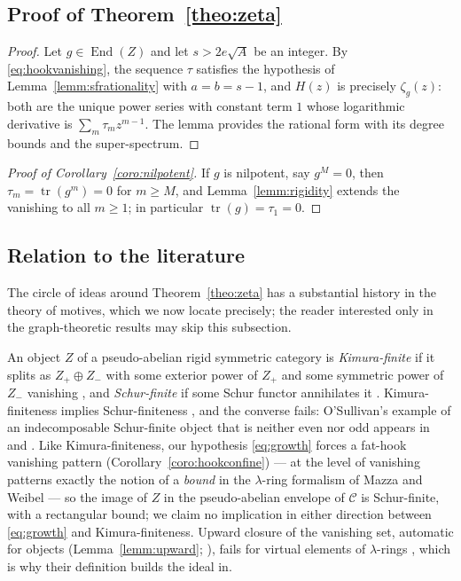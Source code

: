 \documentclass[11pt]{article}
\newcommand{\End}{\operatorname{End}}
\newcommand{\tr}{\operatorname{tr}}
\newcommand{\tzeta}[1]{\zeta_{#1}}                %
\begin{document}
\subsection{Proof of Theorem~\ref{theo:zeta}}\label{subsec:appproof}

\begin{proof}
Let $g\in\End(Z)$ and let $s>2e\sqrt{A}$ be an integer. By
\eqref{eq:hookvanishing}, the sequence $\tau$ satisfies the
hypothesis of Lemma~\ref{lemm:sfrationality} with $a=b=s-1$, and
$H(z)$ is precisely $\tzeta{g}(z)$: both are the unique power
series with constant term $1$ whose logarithmic derivative is
$\sum_{m}\tau_{m}z^{m-1}$. The lemma provides the rational form
with its degree bounds and the super-spectrum.
\end{proof}

\begin{proof}[Proof of Corollary~\ref{coro:nilpotent}]
If $g$ is nilpotent, say
$g^{M}=0$, then $\tau_{m}=\tr(g^{m})=0$ for $m\ge M$, and
Lemma~\ref{lemm:rigidity} extends the vanishing to all $m\ge1$;
in particular $\tr(g)=\tau_{1}=0$.
\end{proof}

\subsection{Relation to the literature}\label{subsec:appliterature}

The circle of ideas around Theorem~\ref{theo:zeta} has a
substantial history in the theory of motives, which we now locate
precisely; the reader interested only in the graph-theoretic
results may skip this subsection.

An object $Z$ of a pseudo-abelian rigid symmetric category is
\emph{Kimura-finite} if it splits as $Z_{+}\oplus Z_{-}$ with some
exterior power of $Z_{+}$ and some symmetric power of $Z_{-}$
vanishing \cite{Kim05,And04}, and \emph{Schur-finite} if some
Schur functor annihilates it \cite{Del02,Maz04}. Kimura-finiteness
implies Schur-finiteness \cite[Cor.~1.5]{Maz04}, and the converse
fails: O'Sullivan's example of an indecomposable Schur-finite
object that is neither even nor odd appears in
\cite[10.1.1]{AK02} and \cite[Ex.~1.12]{Maz04}. Like
Kimura-finiteness, our hypothesis \eqref{eq:growth} forces a
fat-hook vanishing pattern (Corollary~\ref{coro:hookconfine}) ---
at the level of vanishing patterns exactly the notion of a
\emph{bound} in the $\lambda$-ring formalism of Mazza and Weibel
\cite[Def.~4.1]{MW13} --- so the image of $Z$ in the
pseudo-abelian envelope of $\mathcal{C}$ is Schur-finite, with a
rectangular bound; we claim no implication in either direction
between \eqref{eq:growth} and Kimura-finiteness. Upward
closure of the vanishing set, automatic for objects
(Lemma~\ref{lemm:upward}; \cite[Prop.~1.4(2)]{Maz04}), fails for
virtual elements of $\lambda$-rings \cite[Ex.~4.4]{MW13}, which
is why their definition builds the ideal in.
\end{document}
